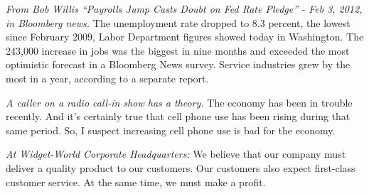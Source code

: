 \begin{exercises}

\item \textit{From Bob Willis “Payrolls Jump Casts Doubt on Fed Rate Pledge” - Feb 3, 2012, in Bloomberg news.} The unemployment rate dropped to 8.3 percent, the lowest since February 2009, Labor Department figures showed today in Washington. The 243,000 increase in jobs was the biggest in nine months and exceeded the most optimistic forecast in a Bloomberg News survey. Service industries grew by the most in a year, according to a separate report.

\item \textit{A caller on a radio call-in show has a theory.} The economy has been in trouble recently. And it's certainly true that cell phone use has been rising during that same period. So, I suspect increasing cell phone use is bad for the economy. 


\item \textit{At Widget-World Corporate Headquarters:} We believe that our company must deliver a quality product to our customers. Our customers also expect first-class customer service. At the same time, we must make a profit. 

      

\end{exercises}
